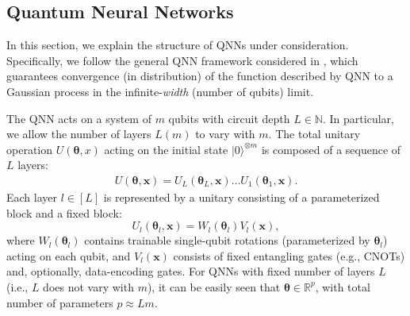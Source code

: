 \documentclass[pdflatex,sn-mathphys-num]{sn-jnl}%
\theoremstyle{thmstyleone}%
\theoremstyle{thmstyletwo}%
\theoremstyle{thmstylethree}%
\newcommand{\xbf}{\mathbf{x}}
\newcommand{\thetabf}{\bm{\theta}}
\begin{document}
\subsection{Quantum Neural Networks} \label{sec:QNN}
In this section, we explain the structure of QNNs under consideration.  Specifically, we follow the general QNN framework considered in \cite{Girardi2025}, which guarantees convergence (in distribution) of the function described by QNN to a Gaussian process in the infinite-{\em width} (number of qubits) limit. %

The QNN acts on a system of $m$ qubits with circuit depth $L \in\mathbb{N}$. In particular, we allow the number of layers $L(m)$ to vary with $m$.
The total unitary operation $U(\bm{\theta}, x)$ acting on the initial state $|0\rangle^{\otimes m}$ is composed of a sequence of $L$ layers: \begin{align}U(\boldsymbol{\theta}, \xbf) = U_L(\boldsymbol{\theta}_L, \xbf) \dots U_1(\boldsymbol{\theta}_1, \xbf).\label{eq:unitary_perlayer}\end{align}
Each layer $l \in [L]$ is represented by a unitary consisting of a parameterized block and a fixed block:
$$U_l(\boldsymbol{\theta}_l, \xbf) = W_l(\boldsymbol{\theta}_l) V_l(\xbf),$$ where $W_l(\boldsymbol{\theta}_l)$ contains trainable single-qubit rotations (parameterized by $\boldsymbol{\theta}_l$) acting on each qubit, and $V_l(\xbf)$ consists of fixed entangling gates (e.g., CNOTs) and, optionally, data-encoding gates. %
For QNNs with fixed number of layers $L$ (i.e., $L$ does not vary with $m$), it can be easily seen that $\thetabf \in \mathbb{R}^p$, with total number of parameters $p \approx Lm$.
\end{document}
